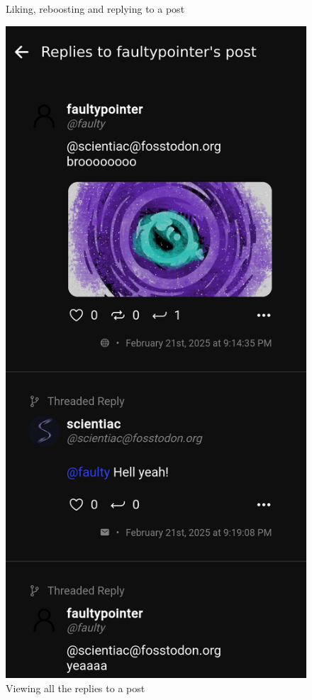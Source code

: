 \begin{figure}[htbp]
\begin{minipage}[b]{0.45\linewidth}
    \caption{Liking, reboosting and replying to a post}
    \label{fig:like_reboost_reply}
  \end{minipage}
  \hfill %
  \begin{minipage}[b]{0.45\linewidth}
    \centering
    \includegraphics[width=\linewidth]{Graphics/postreplies.png}
    \caption{Viewing all the replies to a post}
    \label{fig:post_replies}
  \end{minipage}
\end{figure}


